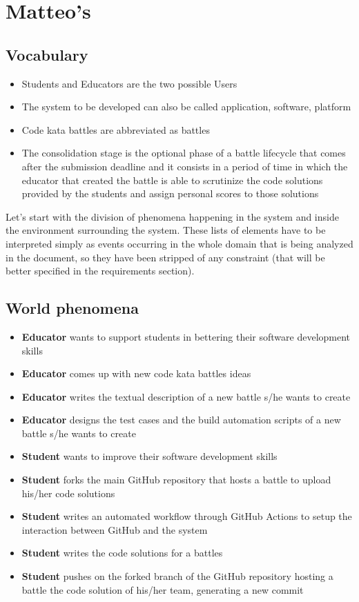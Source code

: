 \section{Matteo's}
	
	\subsection{Vocabulary}
	\begin{itemize}
		\item Students and Educators are the two possible Users
		\item The system to be developed can also be called application, software, platform
		\item Code kata battles are abbreviated as battles
		\item The consolidation stage is the optional phase of a battle lifecycle that comes after the submission deadline and it consists in a period of time in which the educator that created the battle is able to scrutinize the code solutions provided by the students and assign personal scores to those solutions
	\end{itemize}
	
	
	Let's start with the division of phenomena happening in the system and inside the environment surrounding the system. These lists of elements have to be interpreted simply as events occurring in the whole domain that is being analyzed in the document, so they have been stripped of any constraint (that will be better specified in the requirements section).
	
	
	
	\subsection{World phenomena}
	
	\begin{itemize}
		\item \textbf{Educator} wants to support students in bettering their software development skills
		\item \textbf{Educator} comes up with new code kata battles ideas
		\item \textbf{Educator} writes the textual description of a new battle s/he wants to create
		\item \textbf{Educator} designs the test cases and the build automation scripts of a new battle s/he wants to create
		\item \textbf{Student} wants to improve their software development skills
		\item \textbf{Student} forks the main GitHub repository that hosts a battle to upload his/her code solutions
		\item \textbf{Student} writes an automated workflow through GitHub Actions to setup the interaction between GitHub and the system
		\item \textbf{Student} writes the code solutions for a battles
		\item \textbf{Student} pushes on the forked branch of the GitHub repository hosting a battle the  code solution of his/her team, generating a new commit


	\end{itemize}
	
